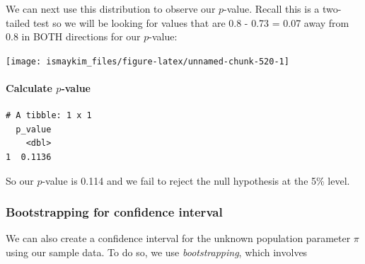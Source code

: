 \documentclass[12pt, krantz2,]{krantz}
\makeatletter
\newenvironment{Shaded}{\begin{snugshade}}{\end{snugshade}}
\newcommand{\DataTypeTok}[1]{\textcolor[rgb]{0.27,0.27,0.27}{#1}}
\newcommand{\KeywordTok}[1]{\textcolor[rgb]{0.27,0.27,0.27}{\textbf{#1}}}
\newcommand{\NormalTok}[1]{#1}
\newcommand{\OperatorTok}[1]{\textcolor[rgb]{0.43,0.43,0.43}{\textbf{#1}}}
\newcommand{\StringTok}[1]{\textcolor[rgb]{0.5,0.5,0.5}{#1}}
\let\oldparagraph\paragraph
\renewcommand{\paragraph}[1]{\oldparagraph{#1}\mbox{}}
\newenvironment{kframe}{%
\medskip{}
\setlength{\fboxsep}{.8em}
 \def\at@end@of@kframe{}%
 \ifinner\ifhmode%
  \def\at@end@of@kframe{\end{minipage}}%
  \begin{minipage}{\columnwidth}%
 \fi\fi%
 \def\FrameCommand##1{\hskip\@totalleftmargin \hskip-\fboxsep
 \colorbox{shadecolor}{##1}\hskip-\fboxsep
     \hskip-\linewidth \hskip-\@totalleftmargin \hskip\columnwidth}%
 \MakeFramed {\advance\hsize-\width
   \@totalleftmargin\z@ \linewidth\hsize
   \@setminipage}}%
 {\par\unskip\endMakeFramed%
 \at@end@of@kframe}
\renewenvironment{Shaded}{\begin{kframe}}{\end{kframe}}
\makeatother
\begin{document}
We can next use this distribution to observe our \(p\)-value. Recall this is a two-tailed test so we will be looking for values that are 0.8 - 0.73 = 0.07 away from 0.8 in BOTH directions for our \(p\)-value:

\begin{Shaded}
\end{Shaded}

\begin{center}\texttt{[image: ismaykim\_files/figure-latex/unnamed-chunk-520-1]} \end{center}

\hypertarget{calculate-p-value-1}{%
\paragraph{\texorpdfstring{Calculate \(p\)-value}{Calculate p-value}}\label{calculate-p-value-1}}

\begin{Shaded}
\end{Shaded}

\begin{verbatim}
# A tibble: 1 x 1
  p_value
    <dbl>
1  0.1136
\end{verbatim}

So our \(p\)-value is 0.114 and we fail to reject the null hypothesis at the 5\% level.

\hypertarget{bootstrapping-for-confidence-interval-1}{%
\subsubsection*{Bootstrapping for confidence interval}\label{bootstrapping-for-confidence-interval-1}}


We can also create a confidence interval for the unknown population parameter \(\pi\) using our sample data. To do so, we use \emph{bootstrapping}, which involves
\end{document}
